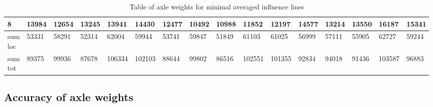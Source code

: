 \begin{sidewaystable}[htpb]
{\begin{tabularx}{\textheight}{ |l|X|X|X|X|X|X|X|X|X|X|X|X|X|X|X| }
			\hline
			8 & 13984   &    12654   &    13245   &    13941   &    14430   &    12477    &   10492    &   10988    &   11852   &    12197   &    14577   &    13214   &    13550   &    16187 & 15341 \\
			\hline
			sum loc & 53331   &    58291   &    52314   &    62004   &    59944   &    53741    &   59847    &   51849    &   61103   &    61025   &    56999   &    57111   &    55905   &   62727 & 59244 \\
			\hline
			sum tot & 89375   &    99936   &    87678   &   106334   &   102103   &    88644    &   99802    &   86516    &  102551   &   101355   &    92834   &    94018   &    91436   &   103587 & 96883 \\
			\hline
		\end{tabularx}}
	\caption{Table of axle weights for minimal averaged influence lines}
	\label{table:axleWeights_for_minimalInfl}
\end{sidewaystable}
\subsection{Accuracy of axle weights}

